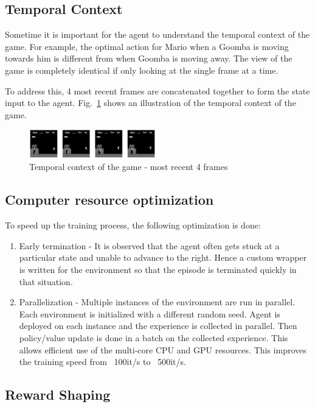 \documentclass[conference]{IEEEtran}
\begin{document}
\subsection{Temporal Context}

Sometime it is important for the agent to understand the temporal context of the game. For example, the optimal action for Mario when a Goomba is moving towards him is different from when Goomba is moving away. The view of the game is completely identical if only looking at the single frame at a time.

To address this, 4 most recent frames are concatenated together to form the state input to the agent. Fig.~\ref{fig:temporal_context} shows an illustration of the temporal context of the game.

\begin{figure}
    \centering
    \includegraphics[width=0.49\textwidth]{temporal_context_mario.png}
    \caption{Temporal context of the game - most recent 4 frames}
    \label{fig:temporal_context}
\end{figure}

\subsection{Computer resource optimization}

To speed up the training process, the following optimization is done:
\begin{enumerate}
    \item Early termination - It is observed that the agent often gets stuck at a particular state and unable to advance to the right. Hence a custom wrapper is written for the environment so that the episode is terminated quickly in that situation.
    \item Parallelization - Multiple instances of the environment are run in parallel. Each environment is initialized with a different random seed. Agent is deployed on each instance and the experience is collected in parallel. Then policy/value update is done in a batch on the collected experience. This allows efficient use of the multi-core CPU and GPU resources. This improves the training speed from ~100it/s to ~500it/s.
\end{enumerate}

\subsection{Reward Shaping}
\end{document}
